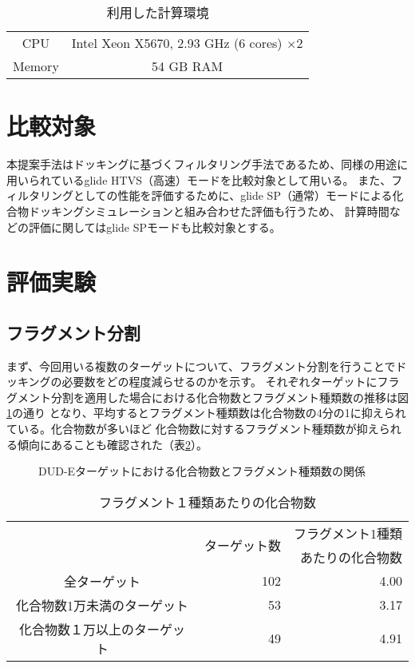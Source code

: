 \begin{table}[htb] \centering
	\caption{利用した計算環境}
	\label{table:computer_node}
	\begin{tabular}{cc}
	\hline
	CPU		&Intel Xeon X5670, 2.93 GHz (6 cores) $\times2$ \\
	Memory	& 54 GB RAM \\ \hline 
	\end{tabular}
\end{table}

\section{比較対象}
本提案手法はドッキングに基づくフィルタリング手法であるため、同様の用途に用いられているglide HTVS（高速）モードを比較対象として用いる。
また、フィルタリングとしての性能を評価するために、glide SP（通常）モードによる化合物ドッキングシミュレーションと組み合わせた評価も行うため、
計算時間などの評価に関してはglide SPモードも比較対象とする。

\section{評価実験}

\subsection{フラグメント分割}\label{subsec:result_decomposition}
まず、今回用いる複数のターゲットについて、フラグメント分割を行うことでドッキングの必要数をどの程度減らせるのかを示す。
それぞれターゲットにフラグメント分割を適用した場合における化合物数とフラグメント種類数の推移は図\ref{fig:dude_decomposition}の通り
となり、平均するとフラグメント種類数は化合物数の4分の1に抑えられている。化合物数が多いほど
化合物数に対するフラグメント種類数が抑えられる傾向にあることも確認された（表\ref{table:dude_decomposition}）。

\begin{figure}[bhtp]
 \begin{center}
  \caption{DUD-Eターゲットにおける化合物数とフラグメント種類数の関係}
  \label{fig:dude_decomposition}
 \end{center}
\end{figure}
\begin{table}[htb] \centering
	\caption{フラグメント１種類あたりの化合物数}
	\label{table:dude_decomposition}
	\begin{tabular}{c|rr}
	\hline
								&\multirow{2}{*}{ターゲット数}	&フラグメント1種類		\\
								&						&あたりの化合物数		\\ \hline
	全ターゲット					&102		&4.00							\\
	化合物数1万未満のターゲット		&53			&3.17							\\
	化合物数１万以上のターゲット	&49			&4.91							\\ \hline
	\end{tabular}
\end{table}



